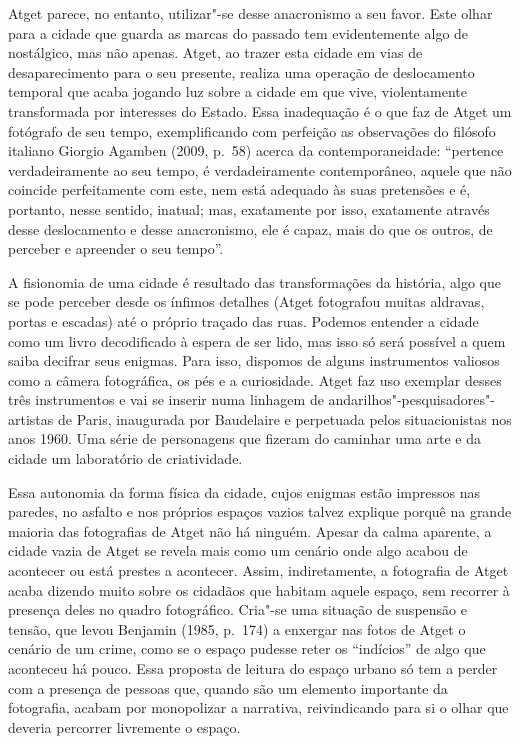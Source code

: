 Atget parece, no entanto, utilizar"-se desse anacronismo a seu favor.
Este olhar para a cidade que guarda as marcas do passado tem
evidentemente algo de nostálgico, mas não apenas. Atget, ao trazer esta
cidade em vias de desaparecimento para o seu presente, realiza uma
operação de deslocamento temporal que acaba jogando luz sobre a cidade
em que vive, violentamente transformada por interesses do Estado. Essa
inadequação é o que faz de Atget um fotógrafo de seu tempo,
exemplificando com perfeição as observações do filósofo italiano Giorgio
Agamben (2009, p.~58) acerca da contemporaneidade: ``pertence
verdadeiramente ao seu tempo, é verdadeiramente contemporâneo, aquele
que não coincide perfeitamente com este, nem está adequado às suas
pretensões e é, portanto, nesse sentido, inatual; mas, exatamente por
isso, exatamente através desse deslocamento e desse anacronismo, ele é
capaz, mais do que os outros, de perceber e apreender o seu tempo''.

A fisionomia de uma cidade é resultado das transformações da história,
algo que se pode perceber desde os ínfimos detalhes (Atget fotografou
muitas aldravas, portas e escadas) até o próprio traçado das ruas.
Podemos entender a cidade como um livro decodificado à espera de ser
lido, mas isso só será possível a quem saiba decifrar seus enigmas. Para
isso, dispomos de alguns instrumentos valiosos como a câmera
fotográfica, os pés e a curiosidade. Atget faz uso exemplar desses três
instrumentos e vai se inserir numa linhagem de
andarilhos"-pesquisadores"-artistas de Paris, inaugurada por Baudelaire e
perpetuada pelos situacionistas nos anos 1960. Uma série de personagens
que fizeram do caminhar uma arte e da cidade um laboratório de
criatividade.

Essa autonomia da forma física da cidade, cujos enigmas estão impressos
nas paredes, no asfalto e nos próprios espaços vazios talvez explique
porquê na grande maioria das fotografias de Atget não há ninguém. Apesar
da calma aparente, a cidade vazia de Atget se revela mais como um
cenário onde algo acabou de acontecer ou está prestes a acontecer.
Assim, indiretamente, a fotografia de Atget acaba dizendo muito sobre os
cidadãos que habitam aquele espaço, sem recorrer à presença deles no
quadro fotográfico. Cria"-se uma situação de suspensão e tensão, que
levou Benjamin (1985, p.~174) a enxergar nas fotos de Atget o cenário de
um crime, como se o espaço pudesse reter os ``indícios'' de algo que
aconteceu há pouco. Essa proposta de leitura do espaço urbano só tem a
perder com a presença de pessoas que, quando são um elemento importante
da fotografia, acabam por monopolizar a narrativa, reivindicando para si
o olhar que deveria percorrer livremente o espaço.

